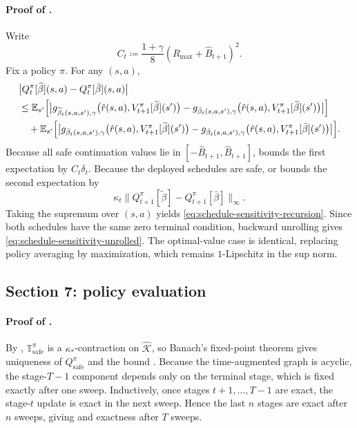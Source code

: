 \documentclass{article}
\theoremstyle{remark}
\newcommand{\E}{\mathbb{E}}
\newcommand{\defeq}{\coloneqq}
\newcommand{\safe}{\mathrm{safe}}
\newcommand{\Ksafe}{\widehat{\mathcal K}}
\newcommand{\Bhat}{\widehat B}
\begin{document}
\paragraph{Proof of .}
Write
\[
C_t\defeq \frac{1+\gamma}{8}(R_{\max}+\Bhat_{t+1})^2.
\]
Fix a policy $\pi$. For any $(s,a)$,
\begin{align*}
&\bigl|Q_t^\pi[\widetilde\beta](s,a)-Q_t^\pi[\bar\beta](s,a)\bigr|\\
&\le
\E_{s'}\Bigl[
\bigl|g_{\widetilde\beta_t(s,a,s'),\gamma}\bigl(\hat r(s,a),V_{t+1}^\pi[\widetilde\beta](s')\bigr)
-
g_{\bar\beta_t(s,a,s'),\gamma}\bigl(\hat r(s,a),V_{t+1}^\pi[\widetilde\beta](s')\bigr)\bigr|
\Bigr]\\
&\quad+
\E_{s'}\Bigl[
\bigl|g_{\bar\beta_t(s,a,s'),\gamma}\bigl(\hat r(s,a),V_{t+1}^\pi[\widetilde\beta](s')\bigr)
-
g_{\bar\beta_t(s,a,s'),\gamma}\bigl(\hat r(s,a),V_{t+1}^\pi[\bar\beta](s')\bigr)\bigr|
\Bigr].
\end{align*}
Because all safe continuation values lie in $[-\Bhat_{t+1},\Bhat_{t+1}]$,  bounds the first expectation by $C_t\delta_t$.
Because the deployed schedules are safe,  or  bounds the second expectation by
\[
\kappa_t\|Q_{t+1}^\pi[\widetilde\beta]-Q_{t+1}^\pi[\bar\beta]\|_\infty.
\]
Taking the supremum over $(s,a)$ yields \eqref{eq:schedule-sensitivity-recursion}. Since both schedules have the same zero terminal condition, backward unrolling gives \eqref{eq:schedule-sensitivity-unrolled}. The optimal-value case is identical, replacing policy averaging by maximization, which remains $1$-Lipschitz in the sup norm.

\subsection{Section 7: policy evaluation}
\label{app:policy-eval}

\paragraph{Proof of .}
By , $\mathbb T_\safe^\pi$ is a $\kappa_*$-contraction on $\Ksafe$, so Banach's fixed-point theorem gives uniqueness of $Q_\safe^\pi$ and the bound .
Because the time-augmented graph is acyclic, the stage-$T-1$ component depends only on the terminal stage, which is fixed exactly after one sweep.
Inductively, once stages $t+1,\dots,T-1$ are exact, the stage-$t$ update is exact in the next sweep.
Hence the last $n$ stages are exact after $n$ sweeps, giving  and exactness after $T$ sweeps.
\end{document}
